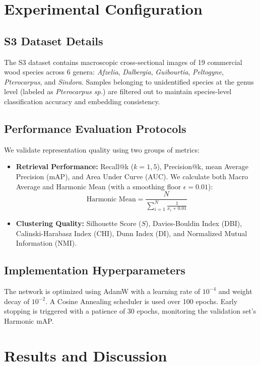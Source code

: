 \documentclass[journal,onecolumn]{IEEEtran}
\begin{document}
\section{Experimental Configuration}

\subsection{S3 Dataset Details}
The S3 dataset contains macroscopic cross-sectional images of 19 commercial wood species across 6 genera: \textit{Afzelia}, \textit{Dalbergia}, \textit{Guibourtia}, \textit{Peltogyne}, \textit{Pterocarpus}, and \textit{Sindora}. Samples belonging to unidentified species at the genus level (labeled as \textit{Pterocarpus sp.}) are filtered out to maintain species-level classification accuracy and embedding consistency.

\subsection{Performance Evaluation Protocols}
We validate representation quality using two groups of metrics:
\begin{itemize}
    \item \textbf{Retrieval Performance:} Recall@k ($k=1,5$), Precision@k, mean Average Precision (mAP), and Area Under Curve (AUC). We calculate both Macro Average and Harmonic Mean (with a smoothing floor $\epsilon = 0.01$):
    \begin{equation}
    \text{Harmonic Mean} = \frac{N}{\sum_{i=1}^N \frac{1}{x_i + 0.01}}
    \end{equation}
    \item \textbf{Clustering Quality:} Silhouette Score ($S$), Davies-Bouldin Index (DBI), Calinski-Harabasz Index (CHI), Dunn Index (DI), and Normalized Mutual Information (NMI).
\end{itemize}

\subsection{Implementation Hyperparameters}
The network is optimized using AdamW with a learning rate of $10^{-4}$ and weight decay of $10^{-2}$. A Cosine Annealing scheduler is used over 100 epochs. Early stopping is triggered with a patience of 30 epochs, monitoring the validation set's Harmonic mAP.

\section{Results and Discussion}
\end{document}
